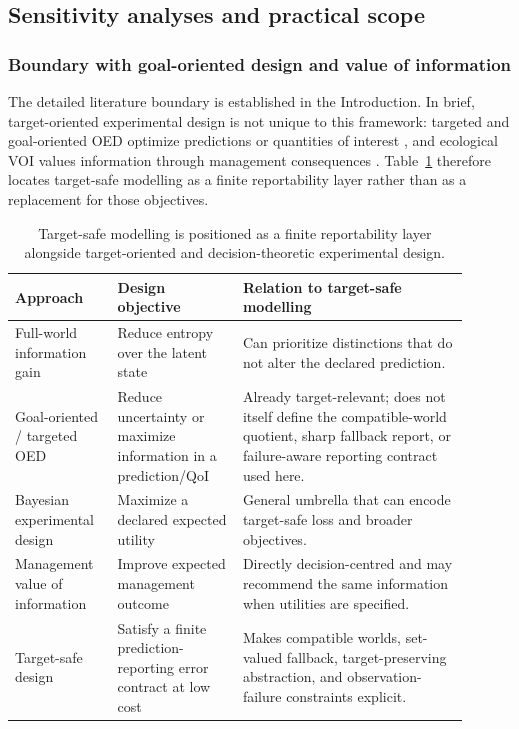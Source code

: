 \subsection{Sensitivity analyses and practical scope}
\subsubsection{Boundary with goal-oriented design and value of information}
The detailed literature boundary is established in the Introduction. In brief, target-oriented experimental design is not unique to this framework: targeted and goal-oriented OED optimize predictions or quantities of interest \cite{VanlierEtAl2012,AttiaEtAl2018,ZhongEtAl2026}, and ecological VOI values information through management consequences \cite{CanessaEtAl2015}. Table~\ref{tab:method-boundaries} therefore locates target-safe modelling as a finite reportability layer rather than as a replacement for those objectives.

\begin{table}[ht]
\centering
\small
\begin{tabular}{p{0.20\linewidth}p{0.25\linewidth}p{0.45\linewidth}}
\toprule
Approach & Design objective & Relation to target-safe modelling \\
\midrule
Full-world information gain & Reduce entropy over the latent state & Can prioritize distinctions that do not alter the declared prediction. \\
Goal-oriented / targeted OED & Reduce uncertainty or maximize information in a prediction/QoI & Already target-relevant; does not itself define the compatible-world quotient, sharp fallback report, or failure-aware reporting contract used here. \\
Bayesian experimental design & Maximize a declared expected utility & General umbrella that can encode target-safe loss and broader objectives. \\
Management value of information & Improve expected management outcome & Directly decision-centred and may recommend the same information when utilities are specified. \\
Target-safe design & Satisfy a finite prediction-reporting error contract at low cost & Makes compatible worlds, set-valued fallback, target-preserving abstraction, and observation-failure constraints explicit. \\
\bottomrule
\end{tabular}
\caption{Target-safe modelling is positioned as a finite reportability layer alongside target-oriented and decision-theoretic experimental design.}
\label{tab:method-boundaries}
\end{table}

